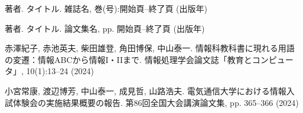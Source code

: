 \documentclass[dvipdfmx]{cs-handout}
\begin{document}
\begin{thebibliography}{99}
  著者. タイトル. 雑誌名, 巻(号):開始頁--終了頁 (出版年)

  著者. タイトル. 論文集名, pp. 開始頁--終了頁 (出版年)

  赤澤紀子, 赤池英夫, 柴田雄登, 角田博保, 中山泰一.
         情報科教科書に現れる用語の変遷：情報ABCから情報I・IIまで.
         情報処理学会論文誌「教育とコンピュータ」, 10(1):13--24 (2024)

  小宮常康, 渡辺博芳, 中山泰一, 成見哲, 山路浩夫.
         電気通信大学における情報入試体験会の実施結果概要の報告.
         第86回全国大会講演論文集, pp. 365--366 (2024)
\end{thebibliography}
\end{document}
